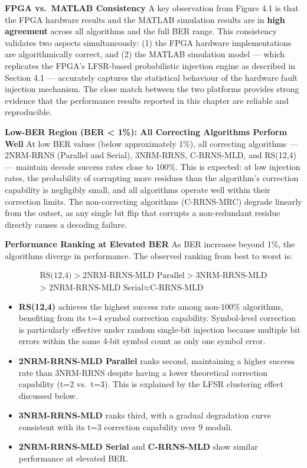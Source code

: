 \documentclass[
  12pt,
  a4paper]{report}
\providecommand{\tightlist}{%
  \setlength{\itemsep}{0pt}\setlength{\parskip}{0pt}}
\begin{document}
\textbf{FPGA vs.~MATLAB Consistency} A key observation from Figure 4.1
is that the FPGA hardware results and the MATLAB simulation results are
in \textbf{high agreement} across all algorithms and the full BER range.
This consistency validates two aspects simultaneously: (1) the FPGA
hardware implementations are algorithmically correct, and (2) the MATLAB
simulation model --- which replicates the FPGA's LFSR-based
probabilistic injection engine as described in Section 4.1 ---
accurately captures the statistical behaviour of the hardware fault
injection mechanism. The close match between the two platforms provides
strong evidence that the performance results reported in this chapter
are reliable and reproducible.

\textbf{Low-BER Region (BER \textless{} 1\%): All Correcting Algorithms
Perform Well} At low BER values (below approximately 1\%), all
correcting algorithms --- 2NRM-RRNS (Parallel and Serial), 3NRM-RRNS,
C-RRNS-MLD, and RS(12,4) --- maintain decode success rates close to
100\%. This is expected: at low injection rates, the probability of
corrupting more residues than the algorithm's correction capability is
negligibly small, and all algorithms operate well within their
correction limits. The non-correcting algorithms (C-RRNS-MRC) degrade
linearly from the outset, as any single bit flip that corrupts a
non-redundant residue directly causes a decoding failure.

\textbf{Performance Ranking at Elevated BER} As BER increases beyond
1\%, the algorithms diverge in performance. The observed ranking from
best to worst is:

\[ \begin{aligned} \text{RS(12,4)} > \text{2NRM-RRNS-MLD Parallel} > \text{3NRM-RRNS-MLD}  \\ \text{> 2NRM-RRNS-MLD Serial} \approx \text{C-RRNS-MLD} \end{aligned} \]

\begin{itemize}
\tightlist
\item
  \textbf{RS(12,4)} achieves the highest success rate among non-100\%
  algorithms, benefiting from its t=4 symbol correction capability.
  Symbol-level correction is particularly effective under random
  single-bit injection because multiple bit errors within the same 4-bit
  symbol count as only one symbol error.
\item
  \textbf{2NRM-RRNS-MLD Parallel} ranks second, maintaining a higher
  success rate than 3NRM-RRNS despite having a lower theoretical
  correction capability (t=2 vs.~t=3). This is explained by the LFSR
  clustering effect discussed below.
\item
  \textbf{3NRM-RRNS-MLD} ranks third, with a gradual degradation curve
  consistent with its t=3 correction capability over 9 moduli.
\item
  \textbf{2NRM-RRNS-MLD Serial} and \textbf{C-RRNS-MLD} show similar
  performance at elevated BER.
\end{itemize}
\end{document}

